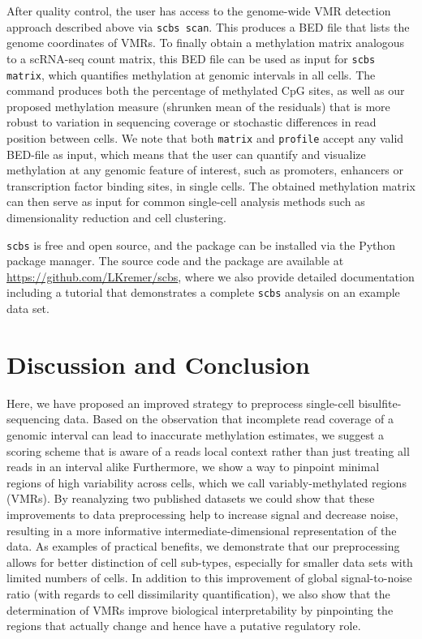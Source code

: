 \documentclass[twocolumn,10pt]{article}
\begin{document}
After quality control, the user has access to the genome-wide VMR detection approach described above via \texttt{scbs scan}. This produces a BED file that lists the genome coordinates of VMRs. To finally obtain a methylation matrix analogous to a scRNA-seq count matrix, this BED file can be used as input for \texttt{scbs matrix}, which quantifies methylation at genomic intervals in all cells. The command produces both the percentage of methylated CpG sites, as well as our proposed methylation measure (shrunken mean of the residuals) that is more robust to variation in sequencing coverage or stochastic differences in read position between cells. We note that both \texttt{matrix} and \texttt{profile} accept any valid BED-file as input, which means that the user can quantify and visualize methylation at any genomic feature of interest, such as promoters, enhancers or transcription factor binding sites, in single cells. The obtained methylation matrix can then serve as input for common single-cell analysis methods such as dimensionality reduction and cell clustering.

\texttt{scbs} is free and open source, and the package can be installed via the Python package manager. The source code and the package are available at \href{https://github.com/LKremer/scbs}{https://github.com/LKremer/scbs}, where we also provide detailed documentation including a tutorial that demonstrates a complete \texttt{scbs} analysis on an example data set.




\section{Discussion and Conclusion}

Here, we have proposed an improved strategy to preprocess single-cell bisulfite-sequencing data.
Based on the observation that incomplete read coverage of a genomic interval can lead to inaccurate methylation estimates, we suggest a scoring scheme that is aware of a reads local context rather than just treating all reads in an interval alike
Furthermore, we show a way to pinpoint minimal regions of high variability across cells, which we call variably-methylated regions (VMRs).
By reanalyzing two published datasets we could show that these improvements to data preprocessing help to increase signal and decrease noise, resulting in a more informative intermediate-dimensional representation of the data. As examples of practical benefits, we demonstrate that our preprocessing allows for better distinction of cell sub-types, especially for smaller data sets with limited numbers of cells. In addition to this improvement of global signal-to-noise ratio (with regards to cell dissimilarity quantification), we also show that the determination of VMRs improve biological interpretability by pinpointing the regions that actually change and hence have a putative regulatory role.
\end{document}
